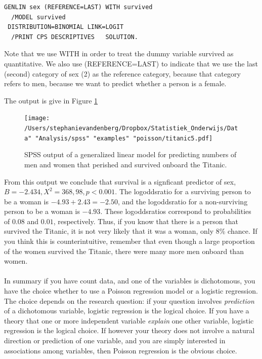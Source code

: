 \documentclass[]{report}\usepackage[]{graphicx}\usepackage[]{color}
\begin{document}
\begin{verbatim}
GENLIN sex (REFERENCE=LAST) WITH survived
  /MODEL survived
 DISTRIBUTION=BINOMIAL LINK=LOGIT
  /PRINT CPS DESCRIPTIVES   SOLUTION.
\end{verbatim}


Note that we use WITH in order to treat the dummy variable survived as quantitative. We also use (REFERENCE=LAST) to indicate that we use the last (second) category of sex (2) as the reference category, because that category refers to men, because we want to predict whether a person is a female.

The output is give in Figure \ref{fig:titanic5}

\begin{figure}[h]
    \begin{center}
       \texttt{[image: /Users/stephanievandenberg/Dropbox/Statistiek\_Onderwijs/Data" "Analysis/spss" "examples" "poisson/titanic5.pdf]}
    \end{center}
     \caption{SPSS output of a generalized linear model for predicting numbers of men and women that perished and survived onboard the Titanic.}
    \label{fig:titanic5}
\end{figure}


From this output we conclude that survival is a signficant predictor of sex, $B=-2.434, X^2=368,98, p<0.001$. The logoddsratio for a surviving person to be a woman is $-4.93 +2.43= -2.50$, and the logoddsratio for a non-surviving person to be a woman is $-4.93$. These logoddsratios correspond to probabilities of $0.08$ and $0.01$, respectively. Thus, if you know that there is a person that survived the Titanic, it is not very likely that it was a woman, only 8\% chance. If you think this is counterintuitive, remember that even though a large proportion of the women survived the Titanic, there were many more men onboard than women.
\\
\\
In summary if you have count data, and one of the variables is dichotomous, you have the choice whether to use a Poisson regression model or a logistic regression. The choice depends on the research question: if your question involves \textit{prediction} of a dichotomous variable, logistic regression is the logical choice. If you have a theory that one or more independent variable \textit{explain} one other variable, logistic regression is the logical choice. If however your theory does not involve a natural direction or prediction of one variable, and you are simply interested in associations among variables, then Poisson regression is the obvious choice.



\end{document}
